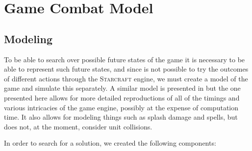 \section{Game Combat Model}

\subsection{Modeling}
To be able to search over possible future states of the game it is necessary to be able to represent such future states,
and since is not possible to try the outcomes of different actions through the \textsc{Starcraft} engine, 
we must create a model of the game and simulate this separately.
A similar model is presented in \cite{portfolio} but the one presented here allows for more detailed reproductions of all of the timings and various intricacies of the game engine, possibly at the expense of computation time.
It also allows for modeling things such as splash damage and spells, but does not, at the moment, consider unit collisions.

In order to search for a solution, we created the following components:

